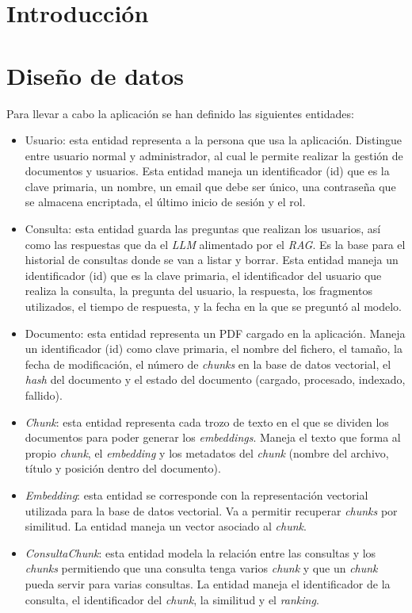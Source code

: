
\section{Introducción}

\section{Diseño de datos}

Para llevar a cabo la aplicación se han definido las siguientes entidades:
\begin{itemize}
\tightlist
	\item Usuario: esta entidad representa a la persona que usa la aplicación. Distingue entre usuario normal y administrador, al cual le permite realizar la gestión de documentos y usuarios. Esta entidad maneja un identificador (id) que es la clave primaria, un nombre, un email que debe ser único, una contraseña que se almacena encriptada, el último inicio de sesión y el rol.
	\item Consulta: esta entidad guarda las preguntas que realizan los usuarios, así como las respuestas que da el \textit{LLM} alimentado por el \textit{RAG}. Es la base para el historial de consultas donde se van a listar y borrar. Esta entidad maneja un identificador (id) que es la clave primaria, el identificador del usuario que realiza la consulta, la pregunta del usuario, la respuesta, los fragmentos utilizados, el tiempo de respuesta, y la fecha en la que se preguntó al modelo.
	\item Documento: esta entidad representa un PDF cargado en la aplicación. Maneja un identificador (id) como clave primaria, el nombre del fichero, el tamaño, la fecha de modificación, el número de \textit{chunks} en la base de datos vectorial, el \textit{hash} del documento y el estado del documento (cargado, procesado, indexado, fallido). 
	\item \textit{Chunk}: esta entidad representa cada trozo de texto en el que se dividen los documentos para poder generar los \textit{embeddings}. Maneja el texto que forma al propio \textit{chunk}, el \textit{embedding} y los metadatos del \textit{chunk} (nombre del archivo, título y posición dentro del documento).
	\item \textit{Embedding}: esta entidad se corresponde con la representación vectorial utilizada para la base de datos vectorial. Va a permitir recuperar \textit{chunks} por similitud. La entidad maneja un vector asociado al \textit{chunk}.
	\item \textit{ConsultaChunk}: esta entidad modela la relación entre las consultas y los \textit{chunks} permitiendo que una consulta tenga varios \textit{chunk} y que un \textit{chunk} pueda servir para varias consultas. La entidad maneja el identificador de la consulta, el identificador del \textit{chunk}, la similitud y el \textit{ranking}.
\end{itemize}

